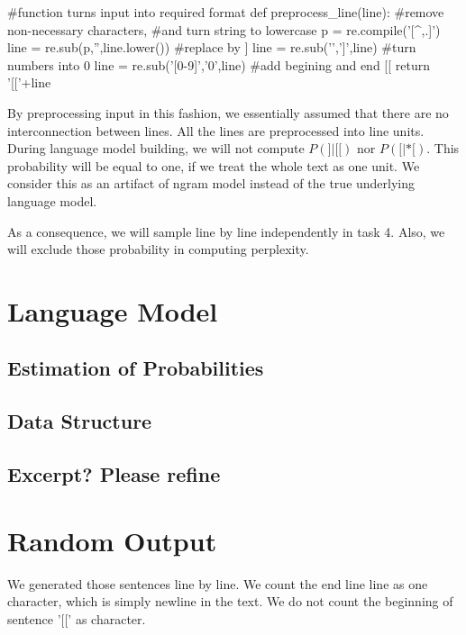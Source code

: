 \documentclass{article}
\begin{document}
\begin{python}

#function turns input into required format
def preprocess_line(line):
    #remove non-necessary characters, 
    #and turn string to lowercase
    p = re.compile('[^\w\s,.]')
    line = re.sub(p,'',line.lower())
    #replace \n by ]
    line = re.sub('\n',']',line)
    #turn numbers into 0
    line = re.sub('[0-9]','0',line)
    #add begining and end [[
    return '[['+line
\end{python}
By preprocessing input in this fashion, we essentially assumed that there are no interconnection between lines. All the lines are preprocessed into line units. During language model building, we will not compute $P(]|[[)$ nor  $P([|*[)$. This probability will be equal to one, if we treat the whole text as one unit. We consider this as an artifact of ngram model instead of the true underlying language model.

As a consequence, we will sample line by line independently in task 4. Also, we will exclude those probability in computing perplexity.

\section{Language Model}

\subsection{Estimation of Probabilities}

\subsection{Data Structure}

\subsection{Excerpt? Please refine}

\section{Random Output}
We generated those sentences line by line. We count the end line line as one character, which is simply newline in the text. We do not count the beginning of sentence '[[' as character.
\end{document}
